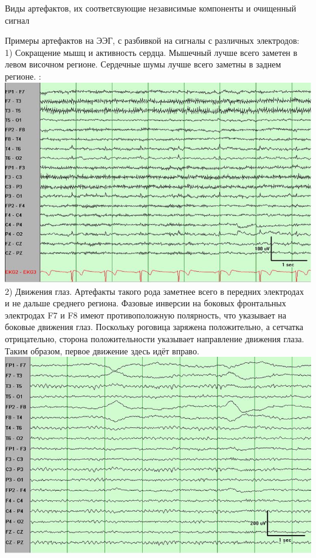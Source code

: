 \documentclass[12pt, a4paper, titlepage]{extreport}
\begin{document}
	\begin{center}
		Виды артефактов, их соответсвующие независимые компоненты и очищенный сигнал  \cite{30}
	\end{center}
	Примеры артефактов на ЭЭГ, с разбивкой на сигналы с различных электродов:\\
	1) Сокращение мышц и активность сердца.  Мышечный лучше всего заметен в левом височном регионе. Сердечные шумы лучше всего заметны в заднем регионе. \cite{31}:\\
		\includegraphics[scale=1]{muscle_artifact.jpg}\\
	2) Движения  глаз. Артефакты такого рода заметнее всего в передних электродах и не дальше среднего региона. Фазовые инверсии на боковых фронтальных электродах F7 и F8 имеют противоположную полярность, что указывает на боковые движения глаз. Поскольку роговица заряжена положительно, а сетчатка отрицательно, сторона положительности указывает направление движения глаза. Таким образом, первое движение здесь идёт вправо. \cite{31}
	\includegraphics[scale=1]{eye_movement_artifact.jpg}\\
\end{document}
